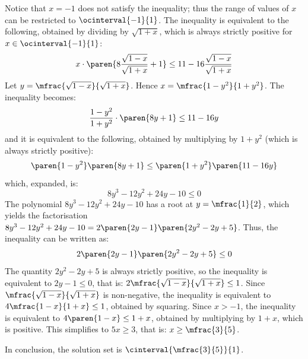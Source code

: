 Notice that $x = -1$ does not satisfy the inequality;
thus the range of values of $x$ can be restricted to $\ocinterval{-1}{1}$.
The inequality is equivalent to the following,
obtained by dividing by $\sqrt{1 + x}$, which is always strictly positive for $x \in \ocinterval{-1}{1}$:
\begin{equation*}
 x \cdot \paren{8 \frac{\sqrt{1 - x}}{\sqrt{1 + x}} + 1}
 \leq
 11 - 16 \frac{\sqrt{1 - x}}{\sqrt{1 + x}}
\end{equation*}
Let $y = \mfrac{\sqrt{1 - x}}{\sqrt{1 + x}}$.
Hence $x = \mfrac{1 - y^2}{1 + y^2}$.
The inequality becomes:
\begin{equation*}
 \frac{1 - y^2}{1 + y^2} \cdot \paren{8 y + 1}
 \leq
 11 - 16 y
\end{equation*}
and it is equivalent to the following,
obtained by multiplying by $1 + y^2$ (which is always strictly positive):
\begin{equation*}
 \paren{1 - y^2} \paren{8 y + 1}
 \leq
 \paren{1 + y^2} \paren{11 - 16 y}
\end{equation*}
which, expanded, is:
\begin{equation*}
 8 y^3 - 12 y^2 + 24 y - 10 \leq 0
\end{equation*}
The polynomial $8 y^3 - 12 y^2 + 24 y - 10$ has a root at $y = \mfrac{1}{2}$,
which yields the factorisation
$8 y^3 - 12 y^2 + 24 y - 10 = 2 \paren{2 y - 1} \paren{2 y^2 - 2y + 5}$.
Thus, the inequality can be written as:
\begin{equation*}
 2 \paren{2 y - 1} \paren{2 y^2 - 2y + 5} \leq 0
\end{equation*}
The quantity $2 y^2 - 2y + 5$ is always strictly positive,
so the inequality is equivalent to $2 y - 1 \leq 0$,
that is: $2 \mfrac{\sqrt{1 - x}}{\sqrt{1 + x}} \leq 1$.
Since $\mfrac{\sqrt{1 - x}}{\sqrt{1 + x}}$ is non-negative,
the inequality is equivalent to $4 \mfrac{1 - x}{1 + x} \leq 1$,
obtained by squaring.
Since $x > -1$, the inequality is equivalent to $4 \paren{1 - x} \leq 1 + x$,
obtained by multiplying by $1 + x$, which is positive.
This simplifies to $5 x \geq 3$, that is: $x \geq \mfrac{3}{5}$.

In conclusion, the solution set is $\cinterval{\mfrac{3}{5}}{1}$.
